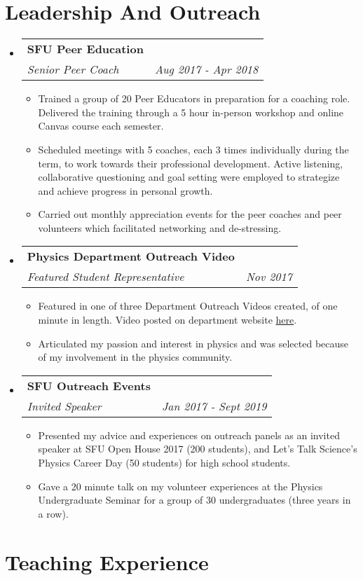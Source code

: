 \documentclass[letterpaper, 11pt]{article}
\makeatletter
\newcommand*{\video}{\href{https://www.sfu.ca/physics/ugrad/prospective-students.html}{here}}
\newcommand{\resitem}[1]{\item #1 \vspace{-2pt}}
\newcommand{\ressubheading}[4]{
	\begin{tabular*}{6.5in}{l@{\extracolsep{\fill}}r}
		\textbf{#1} & #2 \\
		\textit{#3} & \textit{#4} \\
	\end{tabular*}\vspace{-6pt}}
\makeatother
\begin{document}
\section*{Leadership And Outreach}
\begin{itemize} 

\item
\ressubheading{SFU Peer Education}{}{Senior Peer Coach}{Aug 2017 - Apr 2018}
\begin{itemize}
\resitem{Trained a group of 20 Peer Educators in preparation for a coaching role. Delivered the training through a 5 hour in-person workshop and online Canvas course each semester.}
\resitem{Scheduled meetings with 5 coaches, each 3 times individually during the term, to work towards their professional development. Active listening, collaborative questioning and goal setting were employed to strategize and achieve progress in personal growth.} 
\resitem{Carried out monthly appreciation events for the peer coaches and peer volunteers which facilitated networking and de-stressing.}	
\end{itemize}
	
\item
\ressubheading{Physics Department Outreach Video}{}{Featured Student Representative}{Nov 2017}
\begin{itemize}
\resitem{Featured in one of three Department Outreach Videos created, of one minute in length. Video posted on department website \video.} 
\resitem{Articulated my passion and interest in physics and was selected because of my involvement in the physics community.}
\end{itemize}
	
\item
\ressubheading{SFU Outreach Events}{}{Invited Speaker}{Jan 2017 - Sept 2019}
\begin{itemize}	
\resitem{Presented my advice and experiences on outreach panels as an invited speaker at SFU Open House 2017 (200 students), and Let's Talk Science's Physics Career Day (50 students) for high school students.} 
\resitem{Gave a 20 minute talk on my volunteer experiences at the Physics Undergraduate Seminar for a group of 30 undergraduates (three years in a row).}
	
\end{itemize}	
	
\end{itemize}

\section*{Teaching Experience}
\end{document}

